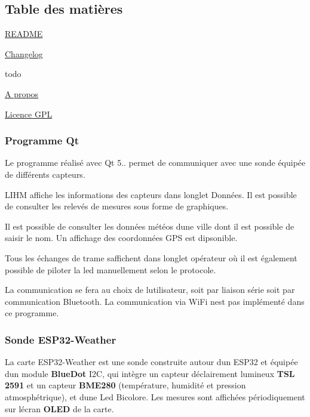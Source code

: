 \hypertarget{index_section_tdm}{}\subsection{Table des matières}\label{index_section_tdm}

\begin{DoxyItemize}
\item \hyperlink{page_README}{R\+E\+A\+D\+ME}
\item \hyperlink{page_changelog}{Changelog}
\item todo
\item \hyperlink{page_about}{A propos}
\item \hyperlink{page_licence}{Licence G\+PL}
\end{DoxyItemize}

\subsubsection*{Programme Qt}

Le programme réalisé avec Qt 5.. permet de communiquer avec une sonde équipée de différents capteurs.

L\textquotesingle{}I\+HM affiche les informations des capteurs dans l\textquotesingle{}onglet Données. Il est possible de consulter les relevés de mesures sous forme de graphiques.



Il est possible de consulter les données météos d\textquotesingle{}une ville dont il est possible de saisir le nom. Un affichage des coordonnées G\+PS est dipsonible.



Tous les échanges de trame s\textquotesingle{}affichent dans l\textquotesingle{}onglet opérateur où il est également possible de piloter la led manuellement selon le protocole.



La communication se fera au choix de l\textquotesingle{}utilisateur, soit par liaison série soit par communication Bluetooth. La communication via Wi\+Fi n\textquotesingle{}est pas implémenté dans ce programme.



\subsubsection*{Sonde E\+S\+P32-\/\+Weather}

La carte E\+S\+P32-\/\+Weather est une sonde construite autour d\textquotesingle{}un E\+S\+P32 et équipée d\textquotesingle{}un module {\bfseries Blue\+Dot} I2C, qui intègre un capteur d\textquotesingle{}éclairement lumineux {\bfseries T\+SL 2591} et un capteur {\bfseries B\+M\+E280} (température, humidité et pression atmosphétrique), et d\textquotesingle{}une Led Bicolore. Les mesures sont affichées périodiquement sur l\textquotesingle{}écran {\bfseries O\+L\+ED} de la carte.

